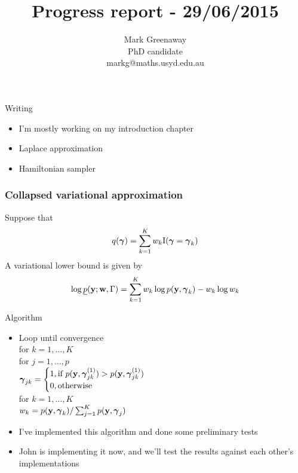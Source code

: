 \documentclass{beamer}
\title{Progress report - 29/06/2015}
\author{Mark Greenaway\\PhD candidate\\markg@maths.usyd.edu.au}
\begin{document}
\begin{frame}
\maketitle
\end{frame}

\begin{frame}{Writing}
\begin{itemize}
\item I'm mostly working on my introduction chapter
\item Laplace approximation
\item Hamiltonian sampler
\end{itemize}
\end{frame}

\begin{frame}
\frametitle{Collapsed variational approximation}
Suppose that
\[
	q({\boldsymbol \gamma}) = \sum_{k=1}^K w_k \text{I}({\boldsymbol \gamma} = {\boldsymbol \gamma}_k)
\]
A variational lower bound is given by
\[
\log \underline{p}({\bf y}; {\bf w}, \Gamma) = \sum_{k=1}^K w_k \log p({\bf y}, {\boldsymbol \gamma}_k) - w_k \log w_k
\]
\end{frame}

\begin{frame}{Algorithm}
\begin{itemize}
\item Loop until convergence\\
\quad for $k = 1,  \ldots, K$\\
\quad \quad for $j = 1, \ldots, p$\\
\quad \quad \quad ${\boldsymbol \gamma}_{jk} = \begin{cases}
1, \text{if } p({\bf y}, {\boldsymbol \gamma}_{jk}^{(1)}) > p({\bf y}, {\boldsymbol \gamma}_{jk}^{(1)}) \\
0, \text{otherwise}
\end{cases}$\\
\quad \quad for $k = 1, \ldots, K$\\
\quad \quad \quad $w_k = p({\bf y}, {\boldsymbol \gamma}_k) / \sum_{j=1}^K p({\bf y}, {\boldsymbol \gamma}_j)$
\item I've implemented this algorithm and done some preliminary tests
\item John is implementing it now, and we'll test the results against each other's implementations
\end{itemize}
\end{frame}
\end{document}

